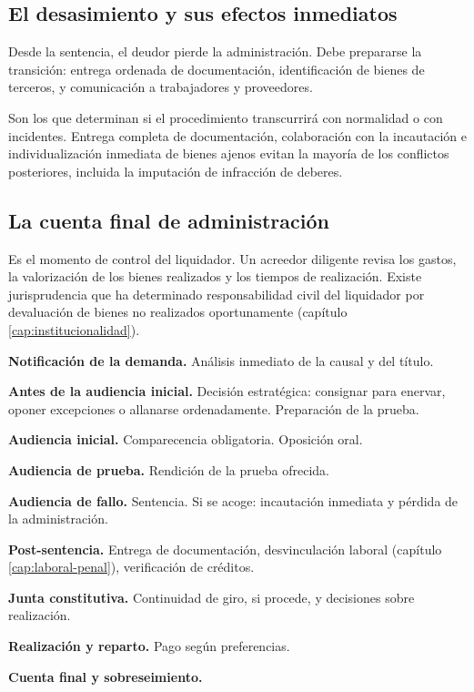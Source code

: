 \subsection{El desasimiento y sus efectos inmediatos}

Desde la sentencia, el deudor pierde la administración. Debe prepararse la transición:
entrega ordenada de documentación, identificación de bienes de terceros, y comunicación a
trabajadores y proveedores.

\begin{foco}
Son los que determinan si el procedimiento transcurrirá con normalidad o con incidentes.
Entrega completa de documentación, colaboración con la incautación e individualización
inmediata de bienes ajenos evitan la mayoría de los conflictos posteriores, incluida la
imputación de infracción de deberes.
\end{foco}

\subsection{La cuenta final de administración}

Es el momento de control del liquidador. Un acreedor diligente revisa los gastos, la
valorización de los bienes realizados y los tiempos de realización. Existe jurisprudencia
que ha determinado responsabilidad civil del liquidador por devaluación de bienes no
realizados oportunamente (capítulo \ref{cap:institucionalidad}).

\bloqueCronograma

\begin{checklist}
  \item \textbf{Notificación de la demanda.} Análisis inmediato de la causal y del
  título.
  \item \textbf{Antes de la audiencia inicial.} Decisión estratégica: consignar para
  enervar, oponer excepciones o allanarse ordenadamente. Preparación de la prueba.
  \item \textbf{Audiencia inicial.} Comparecencia obligatoria. Oposición oral.
  \item \textbf{Audiencia de prueba.} Rendición de la prueba ofrecida.
  \item \textbf{Audiencia de fallo.} Sentencia. Si se acoge: incautación inmediata y
  pérdida de la administración.
  \item \textbf{Post-sentencia.} Entrega de documentación, desvinculación laboral
  (capítulo \ref{cap:laboral-penal}), verificación de créditos.
  \item \textbf{Junta constitutiva.} Continuidad de giro, si procede, y decisiones sobre
  realización.
  \item \textbf{Realización y reparto.} Pago según preferencias.
  \item \textbf{Cuenta final y sobreseimiento.}
\end{checklist}

